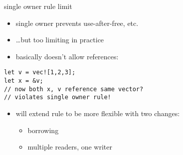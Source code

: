\begin{frame}[fragile,label=singleOwner]{single owner rule limit}
\begin{itemize}
\item single owner prevents use-after-free, etc.
\item \ldots but too limiting in practice
\item basically doesn't allow references:
\end{itemize}
\begin{Verbatim}
let v = vec![1,2,3];
let x = &v;
// now both x, v reference same vector?
// violates single owner rule!
\end{Verbatim}
\begin{itemize}
\item will extend rule to be more flexible with two changes:
    \begin{itemize}
    \item borrowing
    \item multiple readers, one writer
    \end{itemize}
\end{itemize}
\end{frame}


